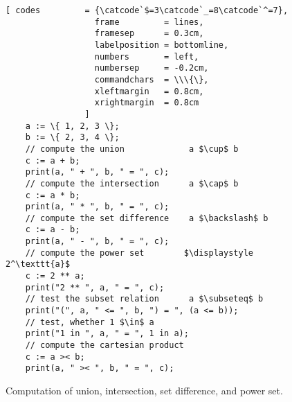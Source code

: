 \begin{figure}[!ht]
  \centering
\begin{Verbatim}[ codes         = {\catcode`$=3\catcode`_=8\catcode`^=7},
                  frame         = lines, 
                  framesep      = 0.3cm, 
                  labelposition = bottomline,
                  numbers       = left,
                  numbersep     = -0.2cm,
                  commandchars  = \\\{\},
                  xleftmargin   = 0.8cm,
                  xrightmargin  = 0.8cm
                ]
    a := \{ 1, 2, 3 \};
    b := \{ 2, 3, 4 \};
    // compute the union             a $\cup$ b 
    c := a + b;
    print(a, " + ", b, " = ", c);
    // compute the intersection      a $\cap$ b
    c := a * b;
    print(a, " * ", b, " = ", c);
    // compute the set difference    a $\backslash$ b
    c := a - b;
    print(a, " - ", b, " = ", c);
    // compute the power set        $\displaystyle 2^\texttt{a}$
    c := 2 ** a;
    print("2 ** ", a, " = ", c);
    // test the subset relation      a $\subseteq$ b
    print("(", a, " <= ", b, ") = ", (a <= b)); 
    // test, whether 1 $\in$ a
    print("1 in ", a, " = ", 1 in a);
    // compute the cartesian product
    c := a >< b;
    print(a, " >< ", b, " = ", c);
\end{Verbatim} 
\vspace*{-0.3cm}
\caption{Computation of union, intersection, set difference, and power set.}
  \label{fig:simple.stlx}
\end{figure} %

